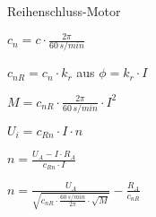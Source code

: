 \documentclass[german]{latex4ei/latex4ei_sheet}
\begin{document}
\begin{sectionbox}
				\begin{symbolbox}{Reihenschluss-Motor}
					\item $c_n = c\cdot \frac{2\pi}{60\,s/min}$
					\item $c_{nR} = c_n \cdot k_r$ aus $\phi= k_r \cdot I$
					\item $M = c_{nR}\cdot \frac{2\pi}{60\,s/min}\cdot I^2$
					\item $U_i = c_{Rn}\cdot I \cdot n$
					\item $n = \frac{U_A-I\cdot R_A}{c_{Rn}\cdot I}$
					\item $n = \frac{U_A}{\sqrt{c_{nR}\cdot \frac{60\,s/min}{2\pi} \cdot \sqrt{M}}}-\frac{R_A}{c_{nR}}$
				\end{symbolbox}
		\end{sectionbox}
	
\end{document}
